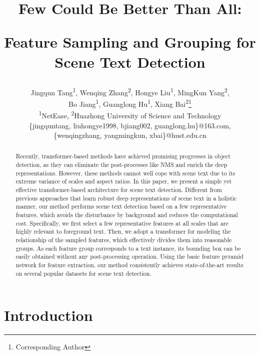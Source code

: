 \documentclass[10pt,twocolumn,letterpaper]{article}
\begin{document}
\title{Few Could Be Better Than All:

Feature Sampling and Grouping for Scene Text Detection}

\author{
Jingqun Tang\textsuperscript{\rm 1},
    Wenqing Zhang\textsuperscript{\rm 2},
    Hongye Liu\textsuperscript{\rm 1},
    MingKun Yang\textsuperscript{\rm 2},\\
    Bo Jiang\textsuperscript{\rm 1},
    Guanglong Hu\textsuperscript{\rm 1},
    Xiang Bai\textsuperscript{\rm 2}\thanks{Corresponding Author}\\
    \textsuperscript{\rm 1}NetEase,
    \textsuperscript{\rm 2}Huazhong University of Science and Technology \\
    \normalsize{\{jingquntang, liuhongye1998, bjiang002, guanglong.hu\}@163.com,} \\ 
    \normalsize{\{wenqingzhang, yangmingkun, xbai\}@hust.edu.cn}
}
\maketitle

\begin{abstract}
Recently, transformer-based methods have achieved promising progresses in object detection, as they can eliminate the post-processes like NMS and enrich the deep representations. However, these methods cannot well cope with scene text due to its extreme variance of scales and aspect ratios. In this paper, we present a simple yet effective transformer-based architecture for scene text detection. Different from previous approaches that learn robust deep representations of scene text in a holistic manner, our method performs scene text detection based on a few representative features, which avoids the disturbance by background and reduces the computational cost. Specifically, we first select a few representative features at all scales that are highly relevant to foreground text. Then, we adopt a transformer for modeling the relationship of the sampled features, which effectively divides them into reasonable groups. As each feature group corresponds to a text instance, its bounding box can be easily obtained without any post-processing operation. Using the basic feature pyramid network for feature extraction, our method consistently achieves state-of-the-art results on several popular datasets for scene text detection.

\end{abstract}

\section{Introduction}
\label{sec:intro}
\end{document}
